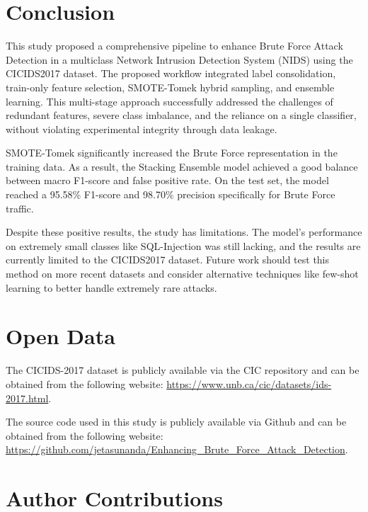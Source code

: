 \documentclass[conference,a4paper]{IEEEtran}
\begin{document}
\section{Conclusion}

This study proposed a comprehensive pipeline to enhance Brute Force Attack Detection in a multiclass Network Intrusion Detection System (NIDS) using the CICIDS2017 dataset. The proposed workflow integrated label consolidation, train-only feature selection, SMOTE-Tomek hybrid sampling, and ensemble learning. This multi-stage approach successfully addressed the challenges of redundant features, severe class imbalance, and the reliance on a single classifier, without violating experimental integrity through data leakage.

SMOTE-Tomek significantly increased the Brute Force representation in the training data. As a result, the Stacking Ensemble model achieved a good balance between macro F1-score and false positive rate. On the test set, the model reached a 95.58\% F1-score and 98.70\% precision specifically for Brute Force traffic.

Despite these positive results, the study has limitations. The model's performance on extremely small classes like SQL-Injection was still lacking, and the results are currently limited to the CICIDS2017 dataset. Future work should test this method on more recent datasets and consider alternative techniques like few-shot learning to better handle extremely rare attacks.


\FloatBarrier

\section*{Open Data}

The CICIDS-2017 dataset is publicly available via the CIC repository and can be obtained from the following website: 
\url{https://www.unb.ca/cic/datasets/ids-2017.html}.

The source code used in this study is publicly available via Github and can be obtained from the following website:
\url{https://github.com/jetasunanda/Enhancing_Brute_Force_Attack_Detection}.

\section*{Author Contributions}
\end{document}
